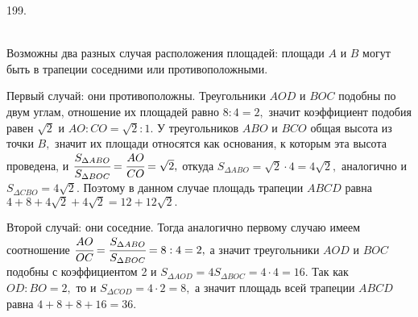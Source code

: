 199. \begin{figure}[ht!]
\end{figure}\\
Возможны два разных случая расположения площадей: площади $A$ и $B$ могут быть в трапеции соседними или противоположными.

Первый случай: они противоположны. Треугольники $AOD$ и $BOC$ подобны по двум углам, отношение их площадей равно $8:4=2,$ значит коэффициент подобия равен $\sqrt{2}$ и $AO:CO=\sqrt{2}:1.$ У треугольников $ABO$ и $BCO$ общая высота из точки $B,$ значит их площади относятся как основания, к которым эта высота проведена, и $\cfrac{S_{\Delta ABO}}{S_{\Delta BOC}}=\cfrac{AO}{CO}=\sqrt{2},$ откуда $S_{\Delta ABO}=\sqrt{2}\cdot4=4\sqrt{2},$ аналогично и $S_{\Delta CBO}=4\sqrt{2}.$ Поэтому в данном случае площадь трапеции $ABCD$ равна $4+8+4\sqrt{2}+4\sqrt{2}=12+12\sqrt{2}.$

Второй случай: они соседние. Тогда аналогично первому случаю имеем соотношение $\cfrac{AO}{OC}=\cfrac{S_{\Delta ABO}}{S_{\Delta BOC}}=8:4=2,$ а значит треугольники $AOD$ и $BOC$ подобны с коэффициентом 2 и $S_{\Delta AOD}=4S_{\Delta BOC}=4\cdot4=16.$ Так как $OD:BO=2,$ то и $S_{\Delta COD}=4\cdot2=8,$ а значит площадь всей трапеции $ABCD$ равна $4+8+8+16=36.$\\
